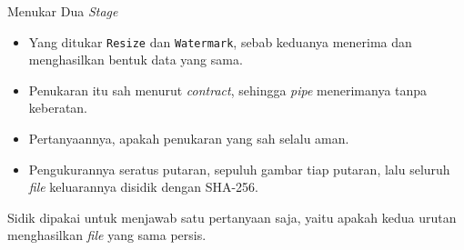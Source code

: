 \documentclass[aspectratio=169, table, 12pt]{beamer}
\begin{document}
\begin{frame}{{\Large Menukar Dua \textit{Stage}}}
  \vspace{10pt}
  \begin{itemize}\small
    \item Yang ditukar \texttt{Resize} dan \texttt{Watermark}, sebab keduanya
          menerima dan menghasilkan bentuk data yang sama.
    \item Penukaran itu sah menurut \textit{contract}, sehingga \textit{pipe}
          menerimanya tanpa keberatan.
    \item Pertanyaannya, apakah penukaran yang sah selalu aman.
    \item Pengukurannya seratus putaran, sepuluh gambar tiap putaran, lalu
          seluruh \textit{file} keluarannya disidik dengan SHA-256.
  \end{itemize}

  \vspace{10pt}
  {\small Sidik dipakai untuk menjawab satu pertanyaan saja, yaitu apakah kedua
  urutan menghasilkan \textit{file} yang sama persis.}
\end{frame}
\end{document}
